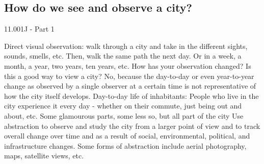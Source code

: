 \documentclass{article}
\begin{document}
        \subsection{How do we see and observe a city?}
        \small 11.001J - Part 1
        \normalsize 
        \begin{outline}
            \1 Direct visual observation: walk through a city and take in the different sights, sounds, smells, etc. Then, walk the same path the next day. Or in a week, a month, a year, two years, ten years, etc. How has your observation changed?
                \2 Is this a good way to view a city? No, because the day-to-day or even year-to-year change as observed by a single observer at a certain time is not representative of how the city itself develops. 
            \1 Day-to-day life of inhabitants: People who live in the city experience it every day - whether on their commute, just being out and about, etc. 
            \1 Some glamourous parts, some less so, but all part of the city
            \1 Use abstraction to observe and study the city from a larger point of view and to track overall change over time and as a result of social, environmental, political, and infrastructure changes. 
                \2 Some forms of abstraction include aerial photography, maps, satellite views, etc. 
        \end{outline}
\end{document}
